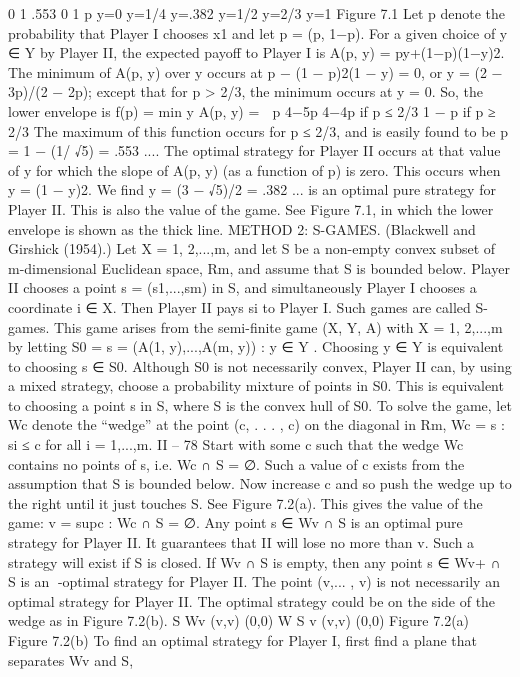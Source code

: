 0 1 .553
0
1
p
y=0
y=1/4
y=.382
y=1/2
y=2/3
y=1
Figure 7.1
Let p denote the probability that Player I chooses x1 and let p = (p, 1−p). For a given
choice of y ∈ Y by Player II, the expected payoff to Player I is A(p, y) = py+(1−p)(1−y)2.
The minimum of A(p, y) over y occurs at p − (1 − p)2(1 − y) = 0, or y = (2 − 3p)/(2 − 2p);
except that for p > 2/3, the minimum occurs at y = 0. So, the lower envelope is
f(p) = min
y
A(p, y) =  p 4−5p
4−4p
if p ≤ 2/3
1 − p if p ≥ 2/3
The maximum of this function occurs for p ≤ 2/3, and is easily found to be p = 1 −
(1/
√5) = .553 .... The optimal strategy for Player II occurs at that value of y for which
the slope of A(p, y) (as a function of p) is zero. This occurs when y = (1 − y)2. We find
y = (3 − √5)/2 = .382 ... is an optimal pure strategy for Player II. This is also the value
of the game. See Figure 7.1, in which the lower envelope is shown as the thick line.
METHOD 2: S-GAMES. (Blackwell and Girshick (1954).) Let X = {1, 2,...,m},
and let S be a non-empty convex subset of m-dimensional Euclidean space, Rm, and
assume that S is bounded below. Player II chooses a point s = (s1,...,sm) in S, and
simultaneously Player I chooses a coordinate i ∈ X. Then Player II pays si to Player I.
Such games are called S-games.
This game arises from the semi-finite game (X, Y, A) with X = {1, 2,...,m} by letting
S0 = {s = (A(1, y),...,A(m, y)) : y ∈ Y }. Choosing y ∈ Y is equivalent to choosing
s ∈ S0. Although S0 is not necessarily convex, Player II can, by using a mixed strategy,
choose a probability mixture of points in S0. This is equivalent to choosing a point s in
S, where S is the convex hull of S0.
To solve the game, let Wc denote the “wedge” at the point (c, . . . , c) on the diagonal
in Rm,
Wc = {s : si ≤ c for all i = 1,...,m}.
II – 78
Start with some c such that the wedge Wc contains no points of s, i.e. Wc ∩ S = ∅. Such
a value of c exists from the assumption that S is bounded below. Now increase c and so
push the wedge up to the right until it just touches S. See Figure 7.2(a). This gives the
value of the game:
v = sup{c : Wc ∩ S = ∅}.
Any point s ∈ Wv ∩ S is an optimal pure strategy for Player II. It guarantees that II will
lose no more than v. Such a strategy will exist if S is closed. If Wv ∩ S is empty, then
any point s ∈ Wv+ ∩ S is an -optimal strategy for Player II. The point (v,... , v) is not
necessarily an optimal strategy for Player II. The optimal strategy could be on the side of
the wedge as in Figure 7.2(b).
S
Wv
(v,v)
(0,0)
W S v
(v,v)
(0,0)
Figure 7.2(a) Figure 7.2(b)
To find an optimal strategy for Player I, first find a plane that separates Wv and S,

